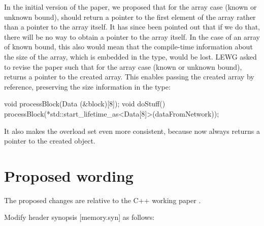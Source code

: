 In the initial version of the paper, we proposed that for the array case (known or unknown bound),  should return a pointer to the first element of the array rather than a pointer to the array itself. It has since been pointed out that if we do that, there will be no way to obtain a pointer to the array itself. In the case of an array of known bound, this also would mean that the compile-time information about the size of the array, which is embedded in the type, would be lost. LEWG asked to revise the paper such that for the array case (known or unknown bound),  returns a pointer to the created array. This enables passing the created array by reference, preserving the size information in the type:

\pagebreak %

\begin{codeblock}
void processBlock(Data (&block)[8]);
void doStuff() {
  processBlock(*std::start_lifetime_as<Data[8]>(dataFromNetwork));
}
\end{codeblock}
It also makes the overload set even more consistent, because now  always returns a pointer to the created object.
\section{Proposed wording}
\label{sec:wording}

The proposed changes are relative to the C++ working paper \cite{N4917}.

Modify header  synopsis [memory.syn] as follows:

